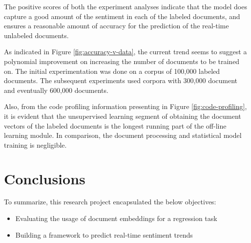 \documentclass[conference]{IEEEtran}
\begin{document}
        \begin{table}[H] \caption{Evaluation results} \label{results}
            \centering
        \end{table}

        The positive scores of both the experiment analyses indicate that the model does capture a good amount of the sentiment in each of the labeled documents, and ensures a reasonable amount of accuracy for the prediction of the real-time unlabeled documents.

        As indicated in Figure \ref{fig:accuracy-v-data}, the current trend seems to suggest a polynomial improvement on increasing the number of documents to be trained on. 
        The initial experimentation was done on a corpus of 100,000 labeled documents. 
        The subsequent experiments used corpora with 300,000 document and eventually 600,000 documents.

        Also, from the code profiling information presenting in Figure \ref{fig:code-profiling}, it is evident that the unsupervised learning segment of obtaining the document vectors of the labeled documents is the longest running part of the off-line learning module. 
        In comparison, the document processing and statistical model training is negligible.

\vspace{5mm}

\section{Conclusions}
    To summarize, this research project encapsulated the below objectives:
    \begin{itemize}
        \item Evaluating the usage of document embeddings for a regression task
        \item Building a framework to predict real-time sentiment trends
    \end{itemize}
\end{document}
